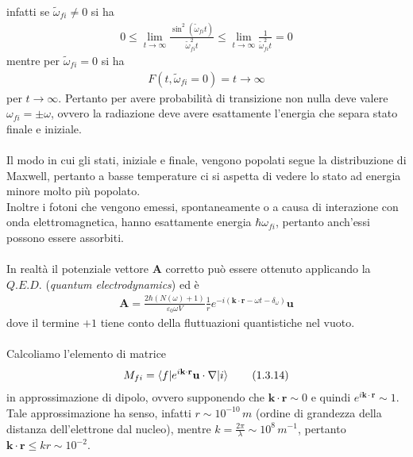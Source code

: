 \documentclass{article}
\begin{document}
infatti se $\tilde{\omega}_{fi} \neq 0$ si ha 
\begin{align}
    0 \leq \lim_{t \rightarrow \infty}\frac{\sin^2(\tilde{\omega}_{fi}t)}{\tilde{\omega}^2_{fi}t} \leq \lim_{t \rightarrow \infty}\frac{1}{\tilde{\omega}^2_{fi}t} = 0 \tag{1.3.11}
\end{align}
mentre per $\tilde{\omega}_{fi} = 0$ si ha 
\begin{align}
    F(t, \tilde{\omega}_{fi} = 0) = t \rightarrow \infty \tag{1.3.12}
\end{align}
per $t \rightarrow \infty$. Pertanto per avere probabilità di transizione non nulla deve valere $\omega_{fi} = \pm \omega$, ovvero la radiazione deve avere esattamente l'energia che separa stato finale e iniziale. \\ \\
Il modo in cui gli stati, iniziale e finale, vengono popolati segue la distribuzione di Maxwell, pertanto a basse temperature ci si aspetta di vedere lo stato ad energia minore molto più popolato. \\
Inoltre i fotoni che vengono emessi, spontaneamente o a causa di interazione con onda elettromagnetica, hanno esattamente energia $\hbar\omega_{fi}$, pertanto anch'essi possono essere assorbiti. \\ \\
In realtà il potenziale vettore $\mathbf{A}$ corretto può essere ottenuto applicando la $Q.E.D.$ (\textit{quantum electrodynamics}) ed è 
\begin{align}
    \mathbf{A} = \frac{2\hbar(N(\omega) + 1)}{\varepsilon_0\omega V}\frac{1}{r}e^{-i(\mathbf{k} \cdot \mathbf{r} - \omega t - \delta_\omega)}\mathbf{u} \tag{1.3.13}
\end{align}
dove il termine $+1$ tiene conto della fluttuazioni quantistiche nel vuoto. \\ \\
Calcoliamo l'elemento di matrice 
\begin{align}
    M_{fi} = \braket{f|e^{i\mathbf{k} \cdot \mathbf{r}}\mathbf{u} \cdot \nabla|i} \tag{1.3.14}
\end{align}
in approssimazione di dipolo, ovvero supponendo che $\mathbf{k} \cdot \mathbf{r} \sim 0$ e quindi $e^{i\mathbf{k} \cdot \mathbf{r}} \sim 1$. Tale approssimazione ha senso, infatti $r \sim 10^{-10} \, m$ (ordine di grandezza della distanza dell'elettrone dal nucleo), mentre $k = \frac{2\pi}{\lambda} \sim 10^8 \, m^{-1}$, pertanto $\mathbf{k} \cdot \mathbf{r} \leq kr \sim 10^{-2}$. \\
\end{document}
